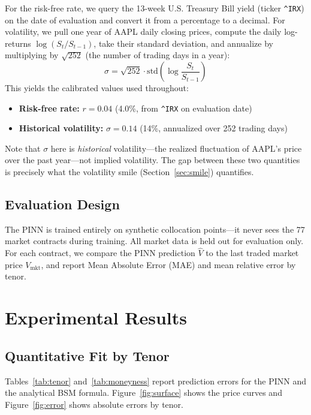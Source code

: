 \documentclass[11pt, twocolumn]{article}
\begin{document}
For the risk-free rate, we query the 13-week U.S. Treasury Bill yield (ticker \texttt{\^{}IRX}) on the date of evaluation and convert it from a percentage to a decimal. For volatility, we pull one year of AAPL daily closing prices, compute the daily log-returns $\log(S_t / S_{t-1})$, take their standard deviation, and annualize by multiplying by $\sqrt{252}$ (the number of trading days in a year):
\begin{equation}
\sigma = \sqrt{252} \cdot \text{std}\!\left(\log\frac{S_t}{S_{t-1}}\right)
\end{equation}
This yields the calibrated values used throughout:
\begin{itemize}
    \item \textbf{Risk-free rate:} $r = 0.04$ (4.0\%, from \texttt{\^{}IRX} on evaluation date)
    \item \textbf{Historical volatility:} $\sigma = 0.14$ (14\%, annualized over 252 trading days)
\end{itemize}
Note that $\sigma$ here is \textit{historical} volatility---the realized fluctuation of AAPL's price over the past year---not implied volatility. The gap between these two quantities is precisely what the volatility smile (Section~\ref{sec:smile}) quantifies.

\subsection{Evaluation Design}
The PINN is trained entirely on synthetic collocation points—it never sees the 77 market contracts during training. All market data is held out for evaluation only. For each contract, we compare the PINN prediction $\hat{V}$ to the last traded market price $V_{\text{mkt}}$, and report Mean Absolute Error (MAE) and mean relative error by tenor.

\section{Experimental Results}
\subsection{Quantitative Fit by Tenor}

Tables~\ref{tab:tenor} and~\ref{tab:moneyness} report prediction errors for the PINN and the analytical BSM formula. Figure~\ref{fig:surface} shows the price curves and Figure~\ref{fig:error} shows absolute errors by tenor.
\end{document}
